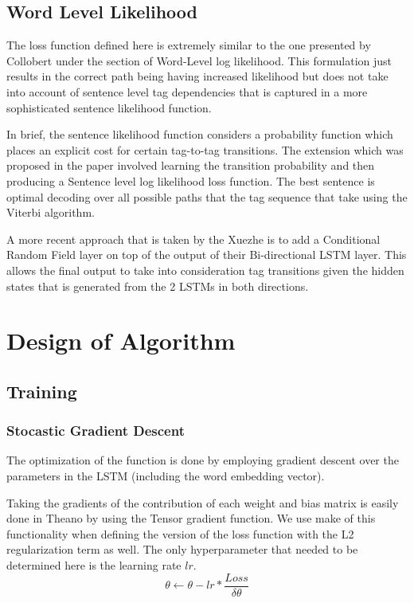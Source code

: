 \documentclass[fyp]{socreport}
\begin{document}
\subsection{Word Level Likelihood}

The loss function defined here is extremely similar to the one presented by
Collobert \cite{DBLP2011Collobert} under the section of Word-Level log
likelihood. This formulation just results in the correct path being having
increased likelihood but does not take into account of sentence level tag
dependencies that is captured in a more sophisticated sentence likelihood
function.

In brief, the sentence likelihood function considers a probability function
which places an explicit cost for certain tag-to-tag transitions. The extension
which was proposed in the paper involved learning the transition probability
and then producing a Sentence level log likelihood loss function. The best
sentence is optimal decoding over all possible paths that the tag sequence that
take using the Viterbi algorithm.

A more recent approach that is taken by the Xuezhe \cite{2016arXiv160301354M}
is to add a Conditional Random Field layer on top of the output of their
Bi-directional LSTM layer. This allows the final output to take into
consideration tag transitions given the hidden states that is
generated from the 2 LSTMs in both directions.


\section{Design of Algorithm}

\subsection{Training}

\subsubsection{Stocastic Gradient Descent} The optimization of the function is
done by employing gradient descent over the parameters in the LSTM (including
the word embedding vector).

Taking the gradients of the contribution of each weight and bias matrix is
easily done in Theano by using the Tensor gradient function. We use make of this
functionality when defining the version of the loss function with the L2
regularization term as well. The only hyperparameter that needed to be
determined here is the learning rate $lr$.
\begin{equation}
  \theta \leftarrow \theta - lr * \frac{Loss}{\delta \theta}
\end{equation}
\end{document}
